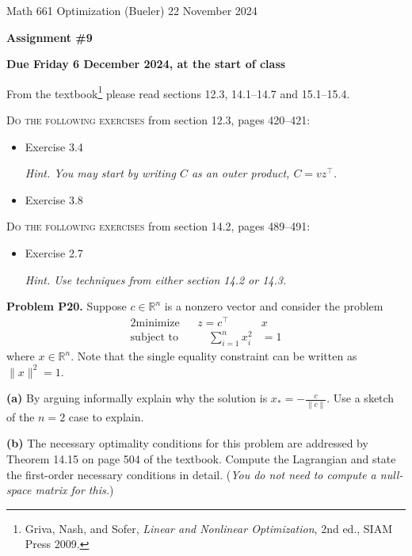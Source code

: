 \documentclass[12pt]{amsart}
\newcommand{\RR}{\mathbb{R}}
\newcommand{\ds}{\displaystyle}
\newcommand{\prob}[1]{\bigskip\noindent\textbf{#1}\quad }
\newcommand{\epart}[1]{\medskip\noindent\textbf{(#1)}\quad }
\begin{document}
\scriptsize \noindent Math 661 Optimization (Bueler) \hfill 22 November 2024
\normalsize

\medskip\bigskip

\Large\centerline{\textbf{Assignment \#9}}
\large
\bigskip

\centerline{\textbf{Due Friday 6 December 2024, at the start of class}}
\bigskip
\normalsize

\thispagestyle{empty}

\bigskip
\noindent From the textbook\footnote{Griva, Nash, and Sofer, \emph{Linear and Nonlinear Optimization}, 2nd ed., SIAM Press 2009.} please read sections 12.3, 14.1--14.7 and 15.1--15.4.

\bigskip
\noindent \textsc{Do the following exercises} from section 12.3, pages 420--421:

\begin{itemize}
\item Exercise 3.4 \quad \begin{minipage}[t]{4.5in} \emph{Hint.  You may start by writing $C$ as an outer product, $C=v z^\top$.} \end{minipage}
\item Exercise 3.8
\end{itemize}

\bigskip
\noindent \textsc{Do the following exercises} from section 14.2, pages 489--491:

\begin{itemize}
\item Exercise 2.7 \quad \begin{minipage}[t]{4.5in} \emph{Hint. Use techniques from \emph{either} section 14.2 or 14.3.} \end{minipage}
\end{itemize}


\prob{Problem P20.}  Suppose $c\in\RR^n$ is a nonzero vector and consider the problem
\begin{alignat*}{2}
    \text{minimize}   &&  z = c^\top &x \\
    \text{subject to} && \quad \sum_{i=1}^n x_i^2 &= 1
\end{alignat*}
where $x\in\RR^n$.  Note that the single equality constraint can be written as $\|x\|^2=1$.

\epart{a}  By arguing informally explain why the solution is $\ds x_* = - \frac{c}{\|c\|}$.  Use a sketch of the $n=2$ case to explain.

\epart{b}  The necessary optimality conditions for this problem are addressed by Theorem 14.15 on page 504 of the textbook.  Compute the Lagrangian and state the first-order necessary conditions in detail.  (\emph{You do \emph{not} need to compute a null-space matrix for this.})
\end{document}
